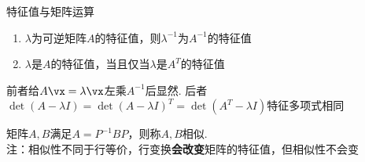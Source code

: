 \begin{proposition}特征值与矩阵运算
\begin{enumerate}
	\itemsep -3pt
	\item $\lambda$为可逆矩阵$A$的特征值，则$\lambda^{-1}$为$A^{-1}$的特征值
	\item $\lambda$是$A$的特征值，当且仅当$\lambda$是$A^T$的特征值
\end{enumerate}
\begin{analysis}
前者给$A\vx=\lambda\vx$左乘$A^{-1}$后显然. 后者$\det(A-\lambda I)=\det(A-\lambda I)^T=\det(A^T-\lambda I)$特征多项式相同\end{analysis}
\end{proposition}
\begin{definition}[相似性]
矩阵$A,B$满足$A=P^{-1}BP$，则称$A,B$相似.\\
注：相似性不同于行等价，行变换\textbf{会改变}矩阵的特征值，但相似性不会变
\end{definition}

